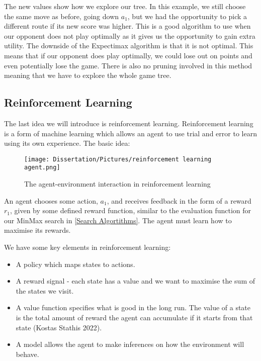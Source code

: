 \documentclass[]{final_report}
\begin{document}
The new values show how we explore our tree. In this example, we still choose the same move as before, going down $a_1$, but we had the opportunity to pick a different route if its new score was higher. This is a good algorithm to use when our opponent does not play optimally as it gives us the opportunity to gain extra utility. The downside of the Expectimax algorithm is that it is not optimal. This means that if our opponent does play optimally, we could lose out on points and even potentially lose the game. There is also no pruning involved in this method meaning that we have to explore the whole game tree. 

\subsection{Reinforcement Learning}\label{Reinforcement Learning}

The last idea we will introduce is reinforcement learning. Reinforcement learning is a form of machine learning which allows an agent to use trial and error to learn using its own experience. The basic idea:

\begin{figure}[!htp]
    \centering
    \texttt{[image: Dissertation/Pictures/reinforcement learning agent.png]}
    \caption{The agent-environment interaction in reinforcement learning\cite{The-Agent-Environment-Interface}}
    \label{fig: reinforcement-learning-model}
\end{figure}

An agent chooses some action, $a_1$, and receives feedback in the form of a reward $r_1$, given by some defined reward function, similar to the evaluation function for our MinMax search in \ref{Search Algortithms}. The agent must learn how to maximise its rewards. 

We have some key elements in reinforcement learning:
\begin{itemize}
    \item A policy which maps states to actions.
    \item A reward signal - each state has a value and we want to maximise the sum of the states we visit. 
    \item A value function specifies what is good in the long run.  The value of a state is the total amount of reward the agent can accumulate if it starts from that state (Kostas Stathis 2022).
    \item A model allows the agent to make inferences on how the environment will behave.
\end{itemize}
\end{document}

